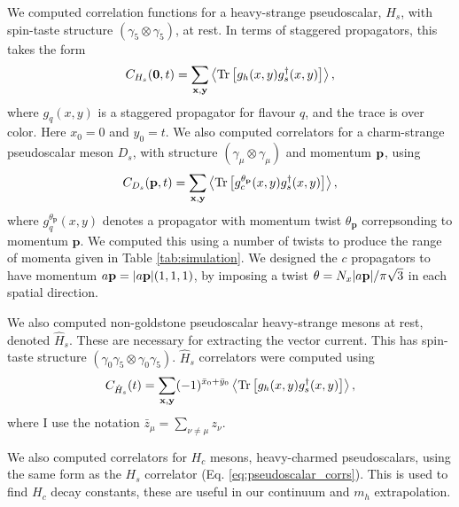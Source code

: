 

We computed correlation functions for a heavy-strange pseudoscalar, $H_s$, with spin-taste structure $(\gamma_5\otimes \gamma_5)$, at rest. In terms of staggered propagators, this takes the form
\begin{align}
  C_{H_s}({\textbf{0}},t) = \sum_{\bf{x},\bf{y}} \left\langle \text{Tr}\left[ g_h(x,y) g_s^{\dagger}(x,y) \right] \right\rangle,
  \label{eq:pseudoscalar_corrs}
\end{align}
where $g_q(x,y)$ is a staggered propagator for flavour $q$, and the trace is over color. Here $x_0=0$ and $y_0=t$. We also computed correlators for a charm-strange pseudoscalar meson $D_s$, with structure $(\gamma_{\mu}\otimes \gamma_{\mu})$ and momentum ${\bf{p}}$, using
\begin{align}
  C_{D_s}({\textbf{p}},t) = \sum_{\bf{x},\bf{y}} \left\langle \text{Tr}\left[ g^{\theta_{\textbf{p}}}_c(x,y) g_s^{\dagger}(x,y) \right] \right\rangle,
\end{align}
where $g_q^{\theta_{\textbf{p}}}(x,y)$ denotes a propagator with momentum twist $\theta_{\textbf{p}}$ correpsonding to momentum ${\textbf{p}}$. We computed this using a number of twists to produce the range of momenta given in Table \ref{tab:simulation}. We designed the $c$ propagators to have momentum $a{\bf{p}} = |a{\bf{p}}|(1,1,1)$, by imposing a twist $\theta = N_x |a{\bf{p}}| / \pi \sqrt{3}$ in each spatial direction.

We also computed non-goldstone pseudoscalar heavy-strange mesons at rest, denoted $\hat{H}_s$. These are necessary for extracting the vector current. This has spin-taste structure $(\gamma_0\gamma_5\otimes \gamma_0\gamma_5)$. $\hat{H}_s$ correlators were computed using
\begin{align}
  C_{\hat{H}_s}(t) = \sum_{\bf{x},\bf{y}}(-1)^{\bar{x}_0+\bar{y}_0} \left\langle \text{Tr}\left[ g_h(x,y) g^{\dagger}_s(x,y) \right] \right\rangle,
\end{align}
where I use the notation $\bar{z}_{\mu} = \sum_{\nu\neq\mu} z_{\nu}$.

We also computed correlators for $H_c$ mesons, heavy-charmed pseudoscalars, using the same form as the $H_s$ correlator (Eq. \eqref{eq:pseudoscalar_corrs}). This is used to find $H_c$ decay constants, these are useful in our continuum and $m_h$ extrapolation.

